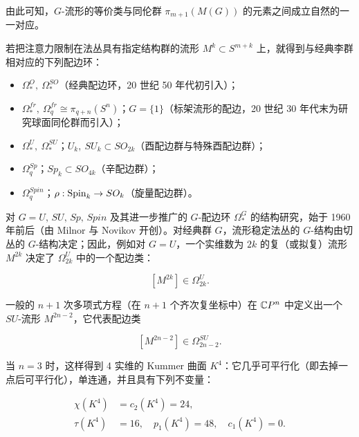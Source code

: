 由此可知，$G$-流形的等价类与同伦群 $\pi_{m+1}(M(G))$ 的元素之间成立自然的一一对应。

若把注意力限制在法丛具有指定结构群的流形 $M^k\subset S^{m+k}$ 上，就得到与经典李群相对应的下列配边环：

\begin{itemize}[label={},leftmargin=2.4em,itemsep=2pt]
\item $\Omega_*^{O},\ \Omega_*^{SO}$（经典配边环，20 世纪 50 年代初引入）；
\item $\Omega_*^{fr},\ \Omega_q^{fr}\cong\pi_{q+n}(S^n)$；$G=\{1\}$（标架流形的配边，20 世纪 30 年代末为研究球面同伦群而引入）；
\item $\Omega_*^{U},\ \Omega_*^{SU}$；$U_k,\ SU_k\subset SO_{2k}$（酉配边群与特殊酉配边群）；
\item $\Omega_q^{Sp}$；$Sp_k\subset SO_{4k}$（辛配边群）；
\item $\Omega_q^{Spin}$；$\rho:\mathrm{Spin}_k\to SO_k$（旋量配边群）。
\end{itemize}


对 $G=U,\,SU,\,Sp,\,Spin$ 及其进一步推广的 $G$-配边环 $\Omega_*^{G}$ 的结构研究，始于 1960 年前后（由 Milnor 与 Novikov 开创）。对经典群 $G$，流形稳定法丛的 $G$-结构由切丛的 $G$-结构决定；因此，例如对 $G=U$，一个实维数为 $2k$ 的复（或拟复）流形 $M^{2k}$ 决定了 $\Omega_{2k}^{U}$ 中的一个配边类：

\[ [M^{2k}]\in\Omega_{2k}^{U}. \]

一般的 $n+1$ 次多项式方程（在 $n+1$ 个齐次复坐标中）在 $\mathbb{C}P^n$ 中定义出一个 $SU$-流形 $M^{2n-2}$，它代表配边类

\[ [M^{2n-2}]\in\Omega_{2n-2}^{SU}. \]

当 $n=3$ 时，这样得到 4 实维的 Kummer 曲面 $K^4$：它几乎可平行化（即去掉一点后可平行化），单连通，并且具有下列不变量：

\begin{align}
\chi(K^4) &= c_2(K^4) = 24, \nonumber\\
\tau(K^4) &= 16, \quad p_1(K^4) = 48, \quad c_1(K^4) = 0. \tag{3.16}
\end{align}

